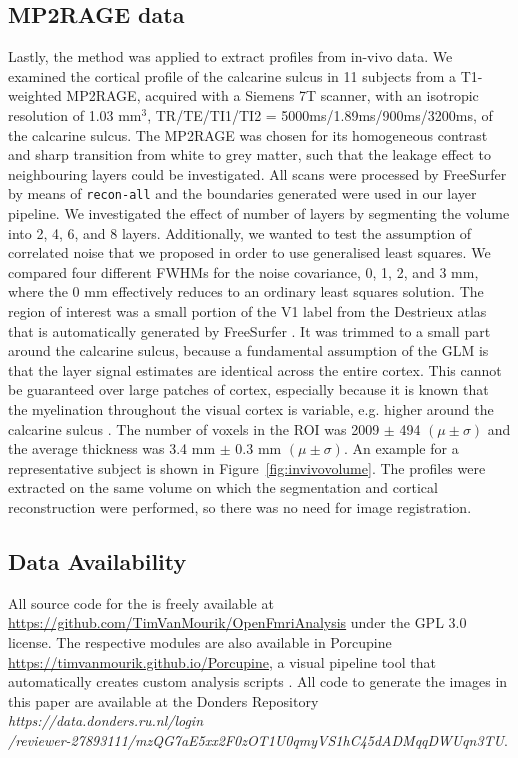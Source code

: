 \subsection{MP2RAGE data}
Lastly, the method was applied to extract profiles from in-vivo data. We examined the cortical profile of the calcarine sulcus in 11 subjects from a T1-weighted MP2RAGE, acquired with a Siemens 7T scanner, with an isotropic resolution of 1.03 mm$^3$, TR/TE/TI1/TI2 = 5000ms/1.89ms/900ms/3200ms, of the calcarine sulcus. The MP2RAGE was chosen for its homogeneous contrast and sharp transition from white to grey matter, such that the leakage effect to neighbouring layers could be investigated. All scans were processed by FreeSurfer \cite{Dale1999} by means of \texttt{recon-all} and the boundaries generated were used in our layer pipeline. We investigated the effect of number of layers by segmenting the volume into 2, 4, 6, and 8 layers. Additionally, we wanted to test the assumption of correlated noise that we proposed in order to use generalised least squares. We compared four different FWHMs for the noise covariance, 0, 1, 2, and 3 mm, where the 0 mm effectively reduces to an ordinary least squares solution. The region of interest was a small portion of the V1 label from the Destrieux atlas that is automatically generated by FreeSurfer \cite{Fischl2004}. It was trimmed to a small part around the calcarine sulcus, because a fundamental assumption of the GLM is that the layer signal estimates are identical across the entire cortex. This cannot be guaranteed over large patches of cortex, especially because it is known that the myelination throughout the visual cortex is variable, e.g. higher around the calcarine sulcus \cite{Bridge2005}. The number of voxels in the ROI was 2009 $\pm$ 494 $(\mu \pm \sigma)$ and the average thickness was 3.4 mm $\pm$ 0.3 mm $(\mu \pm \sigma)$. An example for a representative subject is shown in Figure~\ref{fig:invivovolume}. The profiles were extracted on the same volume on which the segmentation and cortical reconstruction were performed, so there was no need for image registration.


\subsection*{Data Availability}
All source code for the  is freely available at \url{https://github.com/TimVanMourik/OpenFmriAnalysis} under the GPL 3.0 license. The respective modules are also available in Porcupine \url{https://timvanmourik.github.io/Porcupine}, a visual pipeline tool that automatically creates custom analysis scripts \cite{VanMourik2017}. All code to generate the images in this paper are available at the Donders Repository 
\textit{https://data.donders.ru.nl/login}\\
\textit{/reviewer-27893111/mzQG7aE5xx2F0zOT1U0qmyVS1hC45dADMqqDWUqn3TU}.

